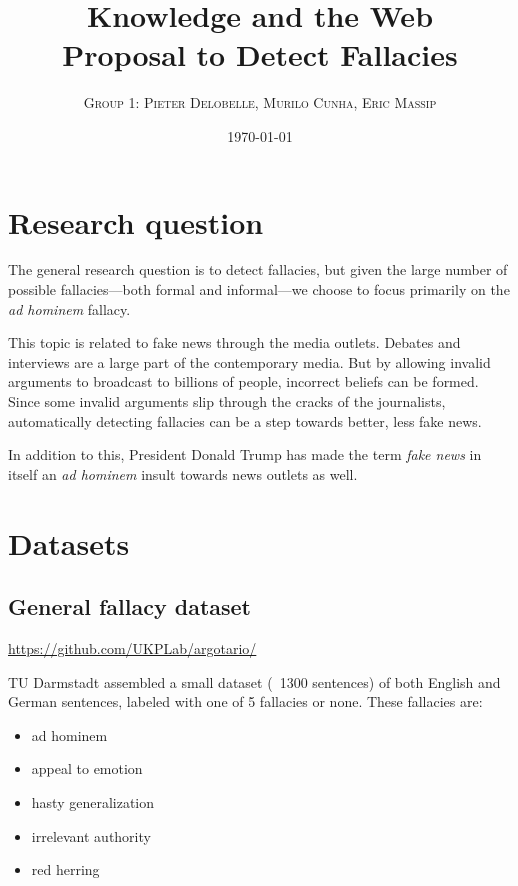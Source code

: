 \documentclass[a4paper]{article}
\begin{document}
\title{Knowledge and the Web \\ 
\large{Proposal to Detect Fallacies}}
\author{\textsc{Group 1: Pieter Delobelle, Murilo Cunha, Eric Massip}}
\date{\today}
\maketitle

\section{Research question}
The general research question is to detect fallacies, but given the large number of possible fallacies---both formal and informal---we choose to focus primarily on the \emph{ad hominem} fallacy. 

This topic is related to fake news through the media outlets. Debates and interviews are a large part of the contemporary media. But by allowing invalid arguments to broadcast to billions of people, incorrect beliefs can be formed. Since some invalid arguments slip through the cracks of the journalists, automatically detecting fallacies can be a step towards better, less fake news.

In addition to this, President Donald Trump has made the term \emph{fake news} in itself an \emph{ad hominem} insult towards news outlets as well. 

\section{Datasets}

\subsection{General fallacy dataset~\cite{Habernal.et.al.2017.EMNLP}}
\url{https://github.com/UKPLab/argotario/}

TU Darmstadt assembled a small dataset (~1300 sentences) of both English and German sentences, labeled with one of 5 fallacies or none. These fallacies are:

\begin{itemize}
    \item ad hominem
    \item appeal to emotion
    \item hasty generalization
    \item irrelevant authority
    \item red herring
\end{itemize}
\end{document}
